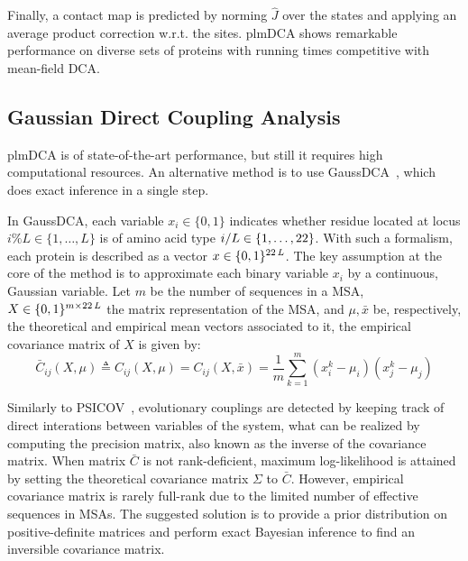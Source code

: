         Finally, a contact map is predicted by norming $\hat{J}$ over the states and applying an average product correction w.r.t. the sites.
        plmDCA shows remarkable performance on diverse sets of proteins with running times competitive with mean-field DCA.


    \subsection{Gaussian Direct Coupling Analysis}

        plmDCA is of state-of-the-art performance, but still it requires high computational resources.
        An alternative method is to use GaussDCA~\cite{10.1371/journal.pone.0092721}, which does
        exact inference in a single step.

        In GaussDCA, each variable $x_i \in \{0, 1\}$ indicates whether residue located at locus $i \% L \in \{ 1, \dotsc, L \}$
        is of amino acid type $i / L \in \{1, \dotsc, 22\}$. With such a formalism, each protein is described as a vector
        $x \in \{0, 1\}^{22\,L}$. The key assumption at the core of the method is to approximate each binary variable $x_i$
        by a continuous, Gaussian variable. Let $m$ be the number of sequences in a MSA, $X \in \{0, 1\}^{m \times 22\,L}$
        the matrix representation of the MSA, and $\mu, \bar{x}$ be, respectively, the theoretical and empirical mean vectors associated to it,
        the empirical covariance matrix of $X$ is given by:
        \begin{equation}
            \bar{C}_{ij}(X, \mu) \triangleq C_{ij}(X, \mu) = C_{ij}(X, \bar{x}) = \frac{1}{m} \sum\limits_{k=1}^m (x_i^k - \mu_i) (x_j^k - \mu_j)
        \end{equation}

        Similarly to PSICOV~\cite{doi:10.1093/bioinformatics/btr638}, evolutionary couplings are detected by keeping track of direct interations
        between variables of the system, what can be realized by computing the precision matrix, also known as the inverse of the covariance matrix.
        When matrix $\bar{C}$ is not rank-deficient, maximum log-likelihood is attained by setting the theoretical covariance matrix
        $\Sigma$ to $\bar{C}$. However, empirical covariance matrix is rarely full-rank due to the limited number of effective sequences
        in MSAs. The suggested solution is to provide a prior distribution on positive-definite matrices and perform exact Bayesian inference
        to find an inversible covariance matrix.

